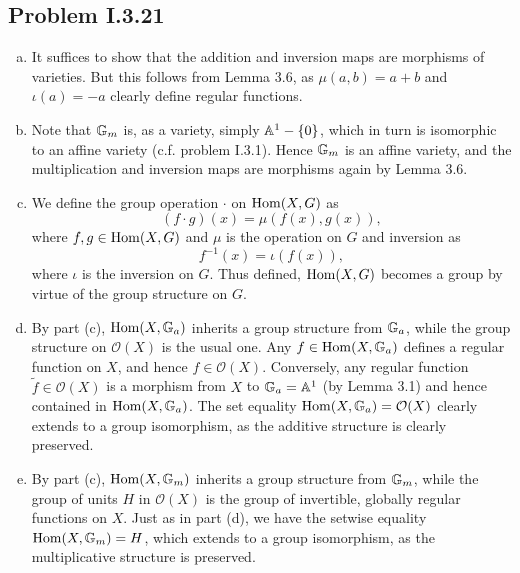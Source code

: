 \documentclass{../mathnotes}
\begin{document}
\subsection*{Problem I.3.21}
\begin{enumerate}[(a)]
    \item It suffices to show that the addition and inversion maps are morphisms of varieties.
        But this follows from Lemma 3.6, as $\mu(a,b)=a+b$ and $\iota(a)=-a$ clearly define
        regular functions.
    \item Note that $\mathbb{G}_m$ is, as a variety, simply $\mathbb{A}^1-\{0\}$, which in turn is isomorphic to 
        an affine variety (c.f. problem I.3.1). Hence $\mathbb{G}_m$ is an affine variety, and the
        multiplication and inversion maps are morphisms again by Lemma 3.6.
    \item We define the group operation $\cdot$ on $\operatorname{Hom}(X,G)$ as
        \[(f\cdot g)(x)=\mu(f(x),g(x)),\]
        where $f,g\in\operatorname{Hom}(X,G)$ and $\mu$ is the operation on $G$ and inversion as
        \[f^{-1}(x)=\iota(f(x)),\]
        where $\iota$ is the inversion on $G$. Thus defined, $\operatorname{Hom}(X,G)$ becomes a group
        by virtue of the group structure on $G$.
    \item By part (c), $\operatorname{Hom}(X,\mathbb{G}_a)$ inherits a group structure from $\mathbb{G}_a$, while the group
        structure on $\mathcal{O}(X)$ is the usual one. Any $f\in\operatorname{Hom}(X,\mathbb{G}_a)$ defines a regular
        function on $X$, and hence $f\in\mathcal{O}(X)$. Conversely, any regular function
        $\tilde f\in\mathcal{O}(X)$ is a morphism from $X$ to $\mathbb{G}_a=\mathbb{A}^1$ (by Lemma 3.1) and
        hence contained in $\operatorname{Hom}(X,\mathbb{G}_a)$. The set equality $\operatorname{Hom}(X,\mathbb{G}_a)=\mathcal{O}(X)$ clearly
        extends to a group isomorphism, as the additive structure is clearly preserved.
    \item By part (c), $\operatorname{Hom}(X,\mathbb{G}_m)$ inherits a group structure from $\mathbb{G}_m$, while the group
        of units $H$ in $\mathcal{O}(X)$ is the group of invertible, globally regular functions
        on $X$. Just as in part (d), we have the setwise equality $\operatorname{Hom}(X,\mathbb{G}_m)=H$, which extends
        to a group isomorphism, as the multiplicative structure is preserved.
\end{enumerate}
\end{document}
